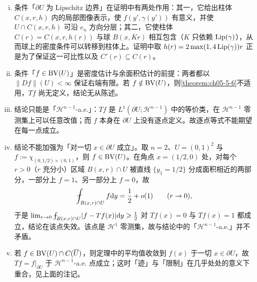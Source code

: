 \documentclass[../../main.tex]{subfiles}%
\begin{document}
\begin{remark}\label{remark:ch05-thm-5-7-条件}
\begin{enumerate}[(i)]
\item 条件「$\partial U$ 为 Lipschitz 边界」在证明中有两处作用：其一，它给出柱体 $C(x,r,h)$ 内的局部图像表示，使 $f(y',\gamma(y'))$ 有意义，并使 $U\cap C(x,r,h)$ 可沿 $e_n$ 方向分层；其二，它使柱体 $C(r)=C(x,r,h(r))$ 与球 $B(x,Kr)$ 相互包含（$K$ 只依赖 $\operatorname{Lip}(\gamma)$），从而球上的密度条件可以转移到柱体上。证明中取 $h(r)=2\max(1,4\operatorname{Lip}(\gamma))r$ 正是为了保证这一可比性以及 $C'(r)\subseteq C(r)$。
\item 条件「$f\in\mathrm{BV}(U)$」是密度估计与余面积估计的前提：两者都以 $\lVert Df\rVert(U)<\infty$ 保证右端有限。若 $f\notin\mathrm{BV}(U)$，则\cref{theorem:ch05-5-6}不适用，$Tf$ 尚无定义，结论无从陈述。%
\item 结论只能是「$\mathcal{H}^{n-1}$-a.e.」：$Tf$ 是 $L^1(\partial U;\mathcal{H}^{n-1})$ 中的等价类，在 $\mathcal{H}^{n-1}$ 零测集上可以任意改值；而 $f$ 本身在 $\partial U$ 上没有逐点定义。故逐点等式不能期望在每一点成立。
\item 结论不能加强为「对一切 $x\in\partial U$ 成立」。取 $n=2$、$U=(0,1)^2$ 与 $f:=\chi_{(0,1/2)\times(0,1)}$，则 $f\in\mathrm{BV}(U)$。在角点 $x=(1/2,0)$ 处，对每个 $r>0$（$r$ 充分小）区域 $B(x,r)\cap U$ 被直线 $\{y_1=1/2\}$ 分成面积相近的两部分，一部分上 $f=1$、另一部分上 $f=0$，故
\begin{align*}
\fint_{B(x,r)\cap U}f\diff y=\frac{1}{2}+o(1)\qquad(r\to0),
\end{align*}
于是 $\lim_{r\to0}\fint_{B(x,r)\cap U}\lvert f-Tf(x)\rvert\diff y\geqslant\frac{1}{2}$ 对 $Tf(x)=0$ 与 $Tf(x)=1$ 都成立，结论在该点失效。该点是 $\mathcal{H}^1$ 零测集，故与结论中的「$\mathcal{H}^{n-1}$-a.e.」并不矛盾。
\item 若 $f\in\mathrm{BV}(U)\cap C(\overline{U})$，则定理中的平均值收敛到 $f(x)$ 于一切 $x\in\partial U$，故 $Tf=f|_{\partial U}$ 于 $\mathcal{H}^{n-1}$-a.e. 点成立；这时「迹」与「限制」在几乎处处的意义下重合，见上面的注记。
\end{enumerate}
\end{remark}
\end{document}
